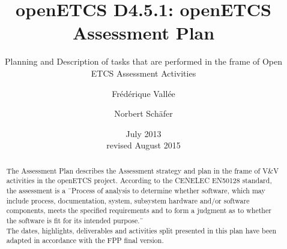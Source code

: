 \documentclass[openetcs]{template/openetcs_article}
\begin{document}
\frontmatter
{}




\title{openETCS D4.5.1: openETCS Assessment Plan}

\subtitle{Planning and Description of tasks that are performed in the frame of Open ETCS Assessment Activities}

\date{July 2013\\revised August 2015}







\author{Fr\'ed\'erique Vall\'ee}


\author{Norbert Sch\"afer}









\begin{abstract}
The Assessment Plan describes the Assessment strategy and plan in the frame of V\&V activities in the openETCS \cite{openETCS} project.
According to the CENELEC EN50128 \cite{EN50128} standard, the assessment is a \"\ Process of analysis to determine whether software, which may include
process, documentation, system, subsystem hardware and/or software components, meets the specified requirements and to form a judgment as to whether the
software is fit for its intended purpose.\"\
\\
The dates, highlights, deliverables and activities split presented in this plan have been adapted in accordance with the FPP \cite{FPP} final version.
\end{abstract}
\end{document}
